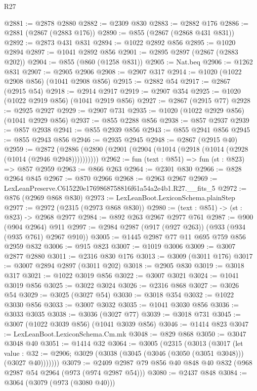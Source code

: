 \begin{lexlean}{R27}
\begin{coremodule}
@2881 := @2878 @2880
@2882 := @2309 @830
@2883 := @2882 @176
@2886 := @2881 (@2867 (@2883 @176))
@2890 := @855 (@2867 (@2868 @431 @831))
@2892 := @2873 @431 @831
@2894 := @1022 @2892 @856
@2895 := @1020 @2894
@2897 := @1041 @2892 @856
@2901 := @2895 @2897 (@2867 (@2883 @202))
@2904 := @855 (@860 (@1258 @831))
@2905 := Nat.beq
@2906 := @1262 @831
@2907 := @2905 @2906
@2908 := @2907 @317
@2914 := @1020 (@1022 @2908 @856) (@1041 @2908 @856)
@2915 := @2882 @54
@2917 := @2867 (@2915 @54)
@2918 := @2914 @2917
@2919 := @2907 @354
@2925 := @1020 (@1022 @2919 @856) (@1041 @2919 @856)
@2927 := @2867 (@2915 @77)
@2928 := @2925 @2927
@2929 := @2907 @731
@2935 := @1020 (@1022 @2929 @856) (@1041 @2929 @856)
@2937 := @855 @2288 @856
@2938 := @857 @2937
@2939 := @857 @2938
@2941 := @855 @2939 @856
@2943 := @855 @2941 @856
@2945 := @855 @2943 @856
@2946 := @2935 @2945
@2948 := @2867 (@2915 @40)
@2959 := @2872 (@2886 (@2890 (@2901 (@2904 (@1014 (@2918 (@1014 (@2928 (@1014 (@2946 @2948))))))))))
@2962 := fun (text : @851) => fun (st : @823) => @857 @2959
@2963 := @866 @263
@2964 := @2301 @830
@2966 := @828 @2964 @845
@2967 := @870 @2966
@2968 := @2963 @2967
@2969 := LexLeanPreserve.C615220e1769868758816f61a54a2e4b1.R27.__fits_5
@2972 := @876 (@2969 @868 @830)
@2973 := LexLeanBoot.LexiconSchema.plainStep
@2977 := @2972 (@2315 (@2973 @868 @830))
@2980 := (text : @851) -> (st : @823) -> @2968 @2977
@2984 := @892 @263 @2967 @2977 @761
@2987 := @900 (@904 @2964) @911
@2997 := @2984 @2987 (@917 (@927 @263)) (@933 (@934 (@935 @761) @2967 @910))
@3005 := @1445 @2987 @77 @11 @695 @759 @856 @2959 @832
@3006 := @915 @823
@3007 := @1019 @3006
@3009 := @3007 @2877 @2880
@3011 := @2316 @830 @176
@3013 := @3009 (@3011 @176)
@3017 := @3007 @2894 @2897 (@3011 @202)
@3018 := @2905 @830
@3019 := @3018 @317
@3021 := @1022 @3019 @856
@3022 := @3007 @3021
@3024 := @1041 @3019 @856
@3025 := @3022 @3024
@3026 := @2316 @868
@3027 := @3026 @54
@3029 := @3025 (@3027 @54)
@3030 := @3018 @354
@3032 := @1022 @3030 @856
@3033 := @3007 @3032
@3035 := @1041 @3030 @856
@3036 := @3033 @3035
@3038 := @3036 (@3027 @77)
@3039 := @3018 @731
@3045 := @3007 (@1022 @3039 @856) (@1041 @3039 @856)
@3046 := @1414 @823
@3047 := LexLeanBoot.LexiconSchema.Cm.mk
@3048 := @829 @868
@3050 := @3047 @3048 @40
@3051 := @1414 @32
@3064 := @3005
    (@2315
      (@3013
        (@3017
          (let value : @32 := @2906;
          @3029 (@3038 (@3045 (@3046 (@3050 (@3051 @3048))) (@3027 @40)))))))
@3079 := @2409 @2987 @79 @856 @40 @848 @40 @832 (@968 @2987 @54 @2964 (@973 (@974 @2987 @54)))
@3080 := @2437 @848
@3084 := @3064 (@3079 (@973 (@3080 @40)))

\end{coremodule}
\end{lexlean}

